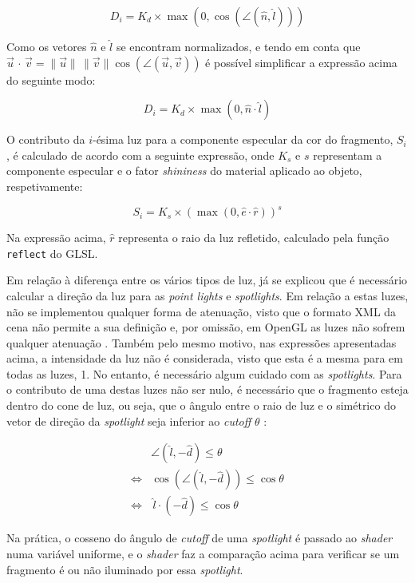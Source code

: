 \documentclass[12pt, a4paper]{article}
\begin{document}
$$
D_i = K_d \times \max \left ( 0, \cos \left ( \angle (\hat{n}, \hat{l}) \right ) \right )
$$

Como os vetores $\hat{n}$ e $\hat{l}$ se encontram normalizados, e tendo em conta que
$
\vec{u} \, \cdot \, \vec{v} =
\lVert \vec{u} \rVert \, \lVert \vec{v} \rVert \cos (\angle (\vec{u}, \vec{v}))
$
é possível simplificar a expressão acima do seguinte modo:

$$
D_i = K_d \times \max \left ( 0, \hat{n} \cdot \hat{l} \right )
$$

O contributo da $i$-ésima luz para a componente especular da cor do fragmento, $S_i$, é calculado
de acordo com a seguinte expressão, onde $K_s$ e $s$ representam a componente especular e o fator
\emph{shininess} do material aplicado ao objeto, respetivamente:

$$
S_i = K_s \times \left ( \max \left (0, \hat{e} \cdot \hat{r} \right ) \right ) ^ s
$$

Na expressão acima, $\hat{r}$ representa o raio da luz refletido, calculado pela função
\texttt{reflect} do GLSL.

Em relação à diferença entre os vários tipos de luz, já se explicou que é necessário calcular a
direção da luz para as \emph{point lights} e \emph{spotlights}. Em relação a estas luzes, não se
implementou qualquer forma de atenuação, visto que o formato XML da cena não permite a sua definição
e, por omissão, em OpenGL as luzes não sofrem qualquer atenuação \cite{glLight}. Também pelo mesmo
motivo, nas expressões apresentadas acima, a intensidade da luz não é considerada, visto que esta é
a mesma para em todas as luzes, 1. No entanto, é necessário algum cuidado com as \emph{spotlights}.
Para o contributo de uma destas luzes não ser nulo, é necessário que o fragmento esteja dentro do
cone de luz, ou seja, que o ângulo entre o raio de luz e o simétrico do vetor de direção da
\emph{spotlight} seja inferior ao \emph{cutoff} $\theta$ \cite{learn-opengl-2}:

\begin{align*}
    & \angle (\hat{l}, -\hat{d}) \le \theta \\
    \Leftrightarrow & \cos \left ( \angle (\hat{l}, -\hat{d}) \right ) \le \cos \theta \\
    \Leftrightarrow & \, \hat{l} \cdot (-\hat{d}) \le \cos \theta
\end{align*}

Na prática, o cosseno do ângulo de \emph{cutoff} de uma \emph{spotlight} é passado ao \emph{shader}
numa variável uniforme, e o \emph{shader} faz a comparação acima para verificar se um fragmento é
ou não iluminado por essa \emph{spotlight}.
\end{document}
